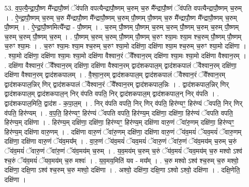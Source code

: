 \documentclass[17pt]{extarticle}
\begin{document}
53. व॒प॒त्यै॒न्द्रा॒पौ॒ष्ण मै᳚न्द्रापौ॒ष्णं ॅव॑पति वपत्यैन्द्रापौ॒ष्णम् च॒रुम् च॒रु मै᳚न्द्रापौ॒ष्णं ॅव॑पति वपत्यैन्द्रापौ॒ष्णम् च॒रुम् । . ऐ॒न्द्रा॒पौ॒ष्णम् च॒रुम् च॒रु मै᳚न्द्रापौ॒ष्ण मै᳚न्द्रापौ॒ष्णम् च॒रुम् पौ॒ष्णम् पौ॒ष्णम् च॒रु मै᳚न्द्रापौ॒ष्ण मै᳚न्द्रापौ॒ष्णम् च॒रुम् पौ॒ष्णम् । . ऐ॒न्द्रा॒पौ॒ष्णमित्यै᳚न्द्रा - पौ॒ष्णम् । . च॒रुम् पौ॒ष्णम् पौ॒ष्णम् च॒रुम् च॒रुम् पौ॒ष्णम् च॒रुम् च॒रुम् पौ॒ष्णम् च॒रुम् च॒रुम् पौ॒ष्णम् च॒रुम् । . पौ॒ष्णम् च॒रुम् च॒रुम् पौ॒ष्णम् पौ॒ष्णम् च॒रुꣳ श्या॒मः श्या॒म श्च॒रुम् पौ॒ष्णम् पौ॒ष्णम् च॒रुꣳ श्या॒मः । . च॒रुꣳ श्या॒मः श्या॒म श्च॒रुम् च॒रुꣳ श्या॒मो दक्षि॑णा॒ दक्षि॑णा श्या॒म श्च॒रुम् च॒रुꣳ श्या॒मो दक्षि॑णा । . श्या॒मो दक्षि॑णा॒ दक्षि॑णा श्या॒मः श्या॒मो दक्षि॑णा वैश्वान॒रं ॅवै᳚श्वान॒रम् दक्षि॑णा श्या॒मः श्या॒मो दक्षि॑णा वैश्वान॒रम् । . दक्षि॑णा वैश्वान॒रं ॅवै᳚श्वान॒रम् दक्षि॑णा॒ दक्षि॑णा वैश्वान॒रम् द्वाद॑शकपाल॒म् द्वाद॑शकपालं ॅवैश्वान॒रम् दक्षि॑णा॒ दक्षि॑णा वैश्वान॒रम् द्वाद॑शकपालम् । . वै॒श्वा॒न॒रम् द्वाद॑शकपाल॒म् द्वाद॑शकपालं ॅवैश्वान॒रं ॅवै᳚श्वान॒रम् द्वाद॑शकपाल॒न्निर् णिर् द्वाद॑शकपालं ॅवैश्वान॒रं ॅवै᳚श्वान॒रम् द्वाद॑शकपाल॒न्निः । . द्वाद॑शकपाल॒न्निर् णिर् द्वाद॑शकपाल॒म् द्वाद॑शकपाल॒न् निर् व॑पति वपति॒ निर् द्वाद॑शकपाल॒म् द्वाद॑शकपाल॒न् निर् व॑पति । . द्वाद॑शकपाल॒मिति॒ द्वाद॑श - क॒पा॒ल॒म् । . निर् व॑पति वपति॒ निर् णिर् व॑पति॒ हिर॑ण्यꣳ॒॒ हिर॑ण्यं ॅवपति॒ निर् णिर् व॑पति॒ हिर॑ण्यम् । . व॒प॒ति॒ हिर॑ण्यꣳ॒॒ हिर॑ण्यं ॅवपति वपति॒ हिर॑ण्य॒म् दक्षि॑णा॒ दक्षि॑णा॒ हिर॑ण्यं ॅवपति वपति॒ हिर॑ण्य॒म् दक्षि॑णा । . हिर॑ण्य॒म् दक्षि॑णा॒ दक्षि॑णा॒ हिर॑ण्यꣳ॒॒ हिर॑ण्य॒म् दक्षि॑णा वारु॒णं ॅवा॑रु॒णम् दक्षि॑णा॒ हिर॑ण्यꣳ॒॒ हिर॑ण्य॒म् दक्षि॑णा वारु॒णम् । . दक्षि॑णा वारु॒णं ॅवा॑रु॒णम् दक्षि॑णा॒ दक्षि॑णा वारु॒णं ॅय॑व॒मयं॑ ॅयव॒मयं॑ ॅवारु॒णम् दक्षि॑णा॒ दक्षि॑णा वारु॒णं ॅय॑व॒मय᳚म् । . वा॒रु॒णं ॅय॑व॒मयं॑ ॅयव॒मयं॑ ॅवारु॒णं ॅवा॑रु॒णं ॅय॑व॒मय॑म् च॒रुम् च॒रुं ॅय॑व॒मयं॑ ॅवारु॒णं ॅवा॑रु॒णं ॅय॑व॒मय॑म् च॒रुम् । . य॒व॒मय॑म् च॒रुम् च॒रुं ॅय॑व॒मयं॑ ॅयव॒मय॑म् च॒रु मश्वो ऽश्व॑ श्च॒रुं ॅय॑व॒मयं॑ ॅयव॒मय॑म् च॒रु मश्वः॑ । . य॒व॒मय॒मिति॑ यव - मय᳚म् । . च॒रु मश्वो ऽश्व॑ श्च॒रुम् च॒रु मश्वो॒ दक्षि॑णा॒ दक्षि॒णा ऽश्व॑ श्च॒रुम् च॒रु मश्वो॒ दक्षि॑णा । . अश्वो॒ दक्षि॑णा॒ दक्षि॒णा ऽश्वो ऽश्वो॒ दक्षि॑णा । . दक्षि॒णेति॒ दक्षि॑णा । \newline
\pagebreak
{}
\end{document}
